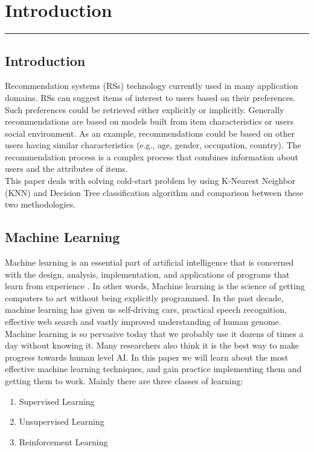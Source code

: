 \documentclass[document.tex]{subfiles}
\begin{document}
\chapter{Introduction}
\hrule
\newpage


\section{Introduction}
\noindent Recommendation systems (RSs) technology currently used in many application domains.  RSs can suggest items of interest to users based on their preferences. Such preferences could be retrieved either explicitly or implicitly. Generally recommendations are based on models built from item characteristics or users social environment. As an example, recommendations could be based on other users having similar characteristics (e.g., age, gender, occupation, country). The recommendation process is a complex process that combines information about users and the attributes of items.\\ 
This paper deals with solving cold-start problem by using K-Nearest Neighbor (KNN) and Decision Tree classification algorithm and comparison between these two methodologies.



\section{Machine Learning}
Machine learning is an essential part of artificial intelligence that is concerned with the design, analysis, implementation, and applications of programs that learn from experience \cite{a1}. In other words, Machine learning is the science of getting computers to act without being explicitly programmed. In the past decade, machine learning has given us self-driving cars, practical speech recognition, effective web search and vastly improved understanding of human genome. Machine learning is so pervasive today that we probably use it dozens of times a day without knowing it. Many researchers also think it is the best way to make progress towards human level AI. In this paper we will learn about the most effective machine learning techniques, and gain practice implementing them and getting them to work. Mainly there are three classes of learning:
\begin{enumerate}[i]
	\item Supervised Learning
	\item Unsupervised Learning
	\item Reinforcement Learning
\end{enumerate}
\end{document}
